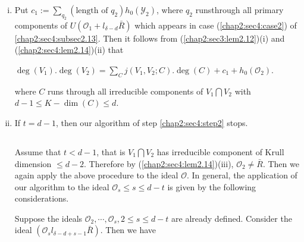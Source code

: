 \setcounter{remarks}{15}
\begin{remarks}\label{chap2:sec4:rem2.16}
  \begin{enumerate}[(i)]
  \item Put $c_1:=\sum \limits_{q_2}(\text {length of }q_2)h_0
    (\mathscr{Y}_2)$, where $q_2$ runs\break  through all primary components
    of $U(\mathscr{O}_1 +l_{\delta -d}\bar{R})$ which appears in case
    (\ref{chap2:sec4:case2}) of \ref{chap2:sec4:subsec2.13}. Then it
    follows from (\ref{chap2:sec3:lem2.12})(i) 
    and (\ref{chap2:sec4:lem2.14})(ii) that  

    $\deg (V_1). \deg (V_2)=\sum \limits_{C} j(V_1,V_2;C). \deg
    (C)+c_1+h_0(\mathscr{O}_2)$. 

    where $C$ runs through all irreducible components of $V_1 \bigcap
    V_2$ with $d-1 \leq K-\dim (C)\leq d$.  
  \item If $t=d-1$, then our algorithm of step \ref{chap2:sec4:step2}
    stops.  

\setcounter{subsection}{16}
\subsection{}\label{chap2:sec4:subsec2.17} Assume
    that $t < d-1$, that is $V_1 \bigcap V_2$ has irreducible component
    of Krull dimension $\leq d-2$. Therefore by (\ref{chap2:sec4:lem2.14})(iii),
    $\mathscr{O}_2 \neq \bar{R}$. Then we again apply the above procedure
    to the ideal $\mathscr{O}$. In general, the application of our
    algorithm to the ideal $\mathscr{O}_s \leq s \leq d-t$ is given by the
    following considerations.  
    
    Suppose the ideals $\mathscr{O}_2, \cdots, \mathscr{O}_s, 2 \leq s
    \leq d-t$ are already defined. Consider the ideal
    $(\mathscr{O}_sl_{\delta-d+s-1}\bar{R})$. Then we have  
  \end{enumerate}
\end{remarks}

